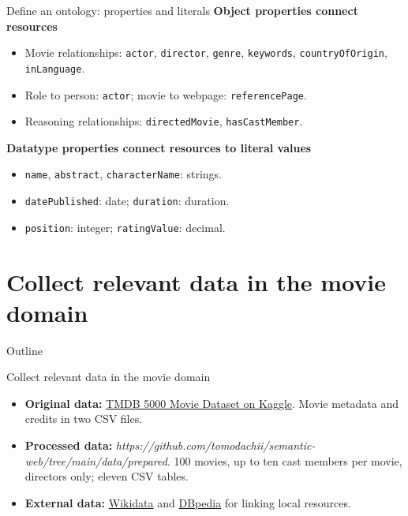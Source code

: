 \documentclass[aspectratio=169,xcolor=dvipsnames]{beamer}
\begin{document}
\begin{frame}{Define an ontology: properties and literals}
\small
\textbf{Object properties connect resources}
\begin{itemize}
\item Movie relationships: \texttt{actor}, \texttt{director}, \texttt{genre},
\texttt{keywords}, \texttt{countryOfOrigin}, \texttt{inLanguage}.
\item Role to person: \texttt{actor}; movie to webpage: \texttt{referencePage}.
\item Reasoning relationships: \texttt{directedMovie}, \texttt{hasCastMember}.
\end{itemize}
\medskip
\textbf{Datatype properties connect resources to literal values}
\begin{itemize}
\item \texttt{name}, \texttt{abstract}, \texttt{characterName}: strings.
\item \texttt{datePublished}: date; \texttt{duration}: duration.
\item \texttt{position}: integer; \texttt{ratingValue}: decimal.
\end{itemize}
\end{frame}


\section{Collect relevant data in the movie domain}

\begin{frame}{Outline}
    \tableofcontents[currentsection]
\end{frame}


\begin{frame}{Collect relevant data in the movie domain}
\begin{itemize}
\item \textbf{Original data:}
\href{https://www.kaggle.com/datasets/tmdb/tmdb-movie-metadata}{TMDB 5000 Movie Dataset on Kaggle}.
Movie metadata and credits in two CSV files.
\medskip
\item \textbf{Processed data:} \textit{https://github.com/tomodachii/semantic-web/tree/main/data/prepared}.
100 movies, up to ten cast members per movie, directors only; eleven CSV tables.
\medskip
\item \textbf{External data:}
\href{https://www.wikidata.org/}{Wikidata} and
\href{https://www.dbpedia.org/}{DBpedia} for linking local resources.
\end{itemize}
\end{frame}
\end{document}
